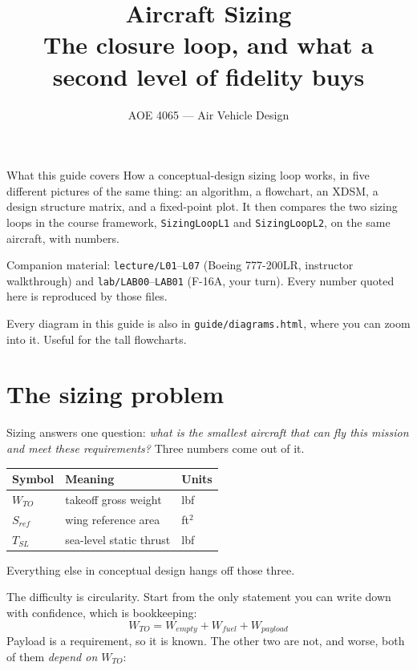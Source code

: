 \documentclass[11pt, a4paper]{article}
\title{\vspace{-14mm}\textbf{Aircraft Sizing}\\[2mm]
       \large The closure loop, and what a second level of fidelity buys}
\author{AOE 4065 --- Air Vehicle Design}
\date{}
\begin{document}
\maketitle
\vspace{-8mm}

\begin{keybox}{What this guide covers}
How a conceptual-design sizing loop works, in five different pictures of the
same thing: an algorithm, a flowchart, an XDSM, a design structure matrix, and
a fixed-point plot. It then compares the two sizing loops in the course
framework, \texttt{SizingLoopL1} and \texttt{SizingLoopL2}, on the same
aircraft, with numbers.

Companion material: \texttt{lecture/L01}--\texttt{L07} (Boeing 777-200LR,
instructor walkthrough) and \texttt{lab/LAB00}--\texttt{LAB01} (F-16A, your
turn). Every number quoted here is reproduced by those files.

Every diagram in this guide is also in \texttt{guide/diagrams.html}, where you
can zoom into it. Useful for the tall flowcharts.
\end{keybox}

\tableofcontents
\vspace{4mm}

\section{The sizing problem}

Sizing answers one question: \emph{what is the smallest aircraft that can fly
this mission and meet these requirements?} Three numbers come out of it.

\begin{center}
\begin{tabular}{@{}lll@{}}
\toprule
Symbol & Meaning & Units \\
\midrule
$W_{TO}$  & takeoff gross weight & lbf \\
$S_{ref}$ & wing reference area  & ft$^2$ \\
$T_{SL}$  & sea-level static thrust & lbf \\
\bottomrule
\end{tabular}
\end{center}

\noindent Everything else in conceptual design hangs off those three.

The difficulty is circularity. Start from the only statement you can write
down with confidence, which is bookkeeping:
\begin{equation}
W_{TO} = W_{empty} + W_{fuel} + W_{payload}
\label{eq:book}
\end{equation}
Payload is a requirement, so it is known. The other two are not, and worse,
both of them \emph{depend on $W_{TO}$}:
\end{document}
